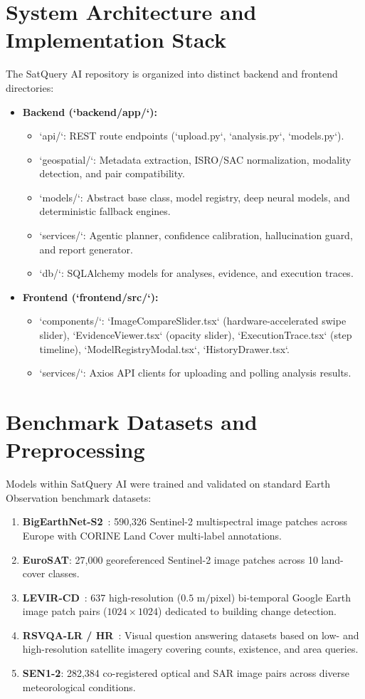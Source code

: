 \documentclass[12pt,a4paper]{report}
\begin{document}
\section{System Architecture and Implementation Stack}
The SatQuery AI repository is organized into distinct backend and frontend directories:
\begin{itemize}
    \item \textbf{Backend (`backend/app/`):}
    \begin{itemize}
        \item `api/`: REST route endpoints (`upload.py`, `analysis.py`, `models.py`).
        \item `geospatial/`: Metadata extraction, ISRO/SAC normalization, modality detection, and pair compatibility.
        \item `models/`: Abstract base class, model registry, deep neural models, and deterministic fallback engines.
        \item `services/`: Agentic planner, confidence calibration, hallucination guard, and report generator.
        \item `db/`: SQLAlchemy models for analyses, evidence, and execution traces.
    \end{itemize}
    \item \textbf{Frontend (`frontend/src/`):}
    \begin{itemize}
        \item `components/`: `ImageCompareSlider.tsx` (hardware-accelerated swipe slider), `EvidenceViewer.tsx` (opacity slider), `ExecutionTrace.tsx` (step timeline), `ModelRegistryModal.tsx`, `HistoryDrawer.tsx`.
        \item `services/`: Axios API clients for uploading and polling analysis results.
    \end{itemize}
\end{itemize}

\section{Benchmark Datasets and Preprocessing}
Models within SatQuery AI were trained and validated on standard Earth Observation benchmark datasets:
\begin{enumerate}
    \item \textbf{BigEarthNet-S2}~\cite{sen12}: 590,326 Sentinel-2 multispectral image patches across Europe with CORINE Land Cover multi-label annotations.
    \item \textbf{EuroSAT}: 27,000 georeferenced Sentinel-2 image patches across 10 land-cover classes.
    \item \textbf{LEVIR-CD}~\cite{bit}: 637 high-resolution ($0.5\text{ m/pixel}$) bi-temporal Google Earth image patch pairs ($1024 \times 1024$) dedicated to building change detection.
    \item \textbf{RSVQA-LR / HR}~\cite{rsvqa}: Visual question answering datasets based on low- and high-resolution satellite imagery covering counts, existence, and area queries.
    \item \textbf{SEN1-2}: 282,384 co-registered optical and SAR image pairs across diverse meteorological conditions.
\end{enumerate}
\end{document}
